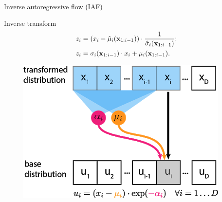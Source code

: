 \begin{frame}{Inverse autoregressive flow (IAF)}
	\begin{minipage}[t]{0.65\columnwidth}
		\begin{block}{Inverse transform}
			\vspace{-0.5cm}
			\begin{align*}
				z_i &= (x_i - \hat{\mu}_i(\mathbf{x}_{1:i-1})) \cdot \frac{1}{\hat{\sigma}_i (\mathbf{x}_{1:i-1}) }; \\
				z_i &= \sigma_i (\mathbf{x}_{1:i-1}) \cdot x_i + \mu_i(\mathbf{x}_{1:i-1}).
			\end{align*}
			\vspace{-0.4cm}
		\end{block}
	\end{minipage}%
	\begin{minipage}[t]{0.35\columnwidth}
		\begin{figure}[h]
			\centering
			\includegraphics[width=.9\linewidth]{figs/maf_iaf_explained_2.png}
		\end{figure}
	\end{minipage}\\
	\vspace{0.1cm}
	

\end{frame}
